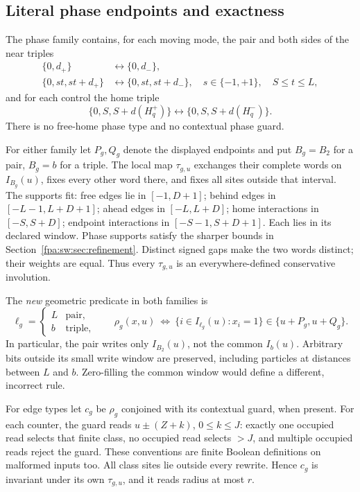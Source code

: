 \documentclass[11pt,a4paper]{article}
\numberwithin{equation}{section}
\begin{document}
\subsection{Literal phase endpoints and exactness}
The phase family contains, for each moving mode, the pair and both sides of the near triples
\begin{align}
\{0,d_+\}&\longleftrightarrow\{0,d_-\},\label{fpa:sw:eq:phase-free}\\
\{0,st,st+d_+\}&\longleftrightarrow\{0,st,st+d_-\},
\quad s\in\{-1,+1\},\quad S\le t\le L,\label{fpa:sw:eq:phase-near}
\end{align}
and for each control the home triple
\begin{equation}\label{fpa:sw:eq:phase-home}
\{0,S,S+d(H_q^+)\}\longleftrightarrow\{0,S,S+d(H_q^-)\}.
\end{equation}
There is no free-home phase type and no contextual phase guard.

For either family let $P_g,Q_g$ denote the displayed endpoints and put $B_g=B_2$ for a pair, $B_g=b$ for a triple. The local map $\tau_{g,u}$ exchanges their complete words on $I_{B_g}(u)$, fixes every other word there, and fixes all sites outside that interval. The supports fit: free edges lie in $[-1,D+1]$; behind edges in $[-L-1,L+D+1]$; ahead edges in $[-L,L+D]$; home interactions in $[-S,S+D]$; endpoint interactions in $[-S-1,S+D+1]$. Each lies in its declared window. Phase supports satisfy the sharper bounds in Section~\ref{fpa:sw:sec:refinement}. Distinct signed gaps make the two words distinct; their weights are equal. Thus every $\tau_{g,u}$ is an everywhere-defined conservative involution.

The \emph{new} geometric predicate in both families is
\begin{equation}\label{fpa:sw:eq:exactness}
\ell_g=\begin{cases}L&\text{pair},\\b&\text{triple},\end{cases}
\qquad
\rho_g(x,u)\ \Longleftrightarrow\
\{i\in I_{\ell_g}(u):x_i=1\}\in\{u+P_g,u+Q_g\}.
\end{equation}
In particular, the pair writes only $I_{B_2}(u)$, not the common $I_b(u)$. Arbitrary bits outside its small write window are preserved, including particles at distances between $L$ and $b$. Zero-filling the common window would define a different, incorrect rule.

For edge types let $c_g$ be $\rho_g$ conjoined with its contextual guard, when present. For each counter, the guard reads $u\pm(Z+k)$, $0\le k\le J$: exactly one occupied read selects that finite class, no occupied read selects $>J$, and multiple occupied reads reject the guard. These conventions are finite Boolean definitions on malformed inputs too. All class sites lie outside every rewrite. Hence $c_g$ is invariant under its own $\tau_{g,u}$, and it reads radius at most $r$.
\end{document}

